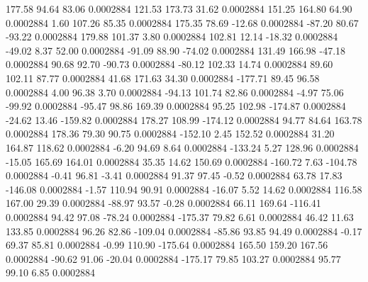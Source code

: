       177.58       94.64       83.06     0.0002884
      121.53      173.73       31.62     0.0002884
      151.25      164.80       64.90     0.0002884
        1.60      107.26       85.35     0.0002884
      175.35       78.69      -12.68     0.0002884
      -87.20       80.67      -93.22     0.0002884
      179.88      101.37        3.80     0.0002884
      102.81       12.14      -18.32     0.0002884
      -49.02        8.37       52.00     0.0002884
      -91.09       88.90      -74.02     0.0002884
      131.49      166.98      -47.18     0.0002884
       90.68       92.70      -90.73     0.0002884
      -80.12      102.33       14.74     0.0002884
       89.60      102.11       87.77     0.0002884
       41.68      171.63       34.30     0.0002884
     -177.71       89.45       96.58     0.0002884
        4.00       96.38        3.70     0.0002884
      -94.13      101.74       82.86     0.0002884
       -4.97       75.06      -99.92     0.0002884
      -95.47       98.86      169.39     0.0002884
       95.25      102.98     -174.87     0.0002884
      -24.62       13.46     -159.82     0.0002884
      178.27      108.99     -174.12     0.0002884
       94.77       84.64      163.78     0.0002884
      178.36       79.30       90.75     0.0002884
     -152.10        2.45      152.52     0.0002884
       31.20      164.87      118.62     0.0002884
       -6.20       94.69        8.64     0.0002884
     -133.24        5.27      128.96     0.0002884
      -15.05      165.69      164.01     0.0002884
       35.35       14.62      150.69     0.0002884
     -160.72        7.63     -104.78     0.0002884
       -0.41       96.81       -3.41     0.0002884
       91.37       97.45       -0.52     0.0002884
       63.78       17.83     -146.08     0.0002884
       -1.57      110.94       90.91     0.0002884
      -16.07        5.52       14.62     0.0002884
      116.58      167.00       29.39     0.0002884
      -88.97       93.57       -0.28     0.0002884
       66.11      169.64     -116.41     0.0002884
       94.42       97.08      -78.24     0.0002884
     -175.37       79.82        6.61     0.0002884
       46.42       11.63      133.85     0.0002884
       96.26       82.86     -109.04     0.0002884
      -85.86       93.85       94.49     0.0002884
       -0.17       69.37       85.81     0.0002884
       -0.99      110.90     -175.64     0.0002884
      165.50      159.20      167.56     0.0002884
      -90.62       91.06      -20.04     0.0002884
     -175.17       79.85      103.27     0.0002884
       95.77       99.10        6.85     0.0002884
